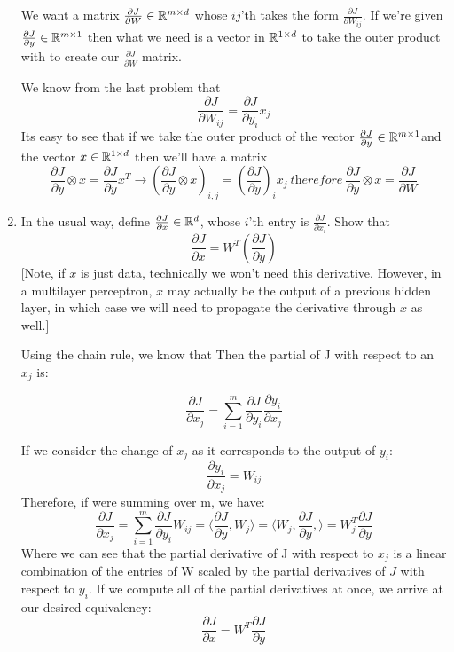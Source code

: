 \documentclass{article}
\theoremstyle{plain}
\theoremstyle{definition}
\begin{document}
\begin{enumerate}
\subitem

We want a matrix $\frac{\partial J}{\partial W}\in\mathbb{R}^{m\times d}$ whose $ij$'th takes the form $\frac{\partial J}{\partial W_{ij}}$. If we're given $\frac{\partial J}{\partial y}\in\mathbb{R}^{m\times1}$ then what we need is a vector in $\mathbb{R}^{1 \times d}$ to take the outer product with to create our $\frac{\partial J}{\partial W}$ matrix.

We know from the last problem that 
$$
\frac{\partial J}{\partial W_{ij}}=\frac{\partial J}{\partial y_{i}}x_{j}
$$
Its easy to see that if we take the outer product of the vector $\frac{\partial J}{\partial y} \in \mathbb{R}^{m \times 1}$and the vector $x \in \mathbb{R}^{1\times d}$ then we'll have a matrix 
$$
 \frac{\partial J}{\partial y} \otimes x = \frac{\partial J}{\partial y}x^T \rightarrow \left(\frac{\partial J}{\partial y}\otimes x\right)_{i,j} = \left(\frac{\partial J}{\partial y}\right)_i x_j \ \textit{therefore} \  \frac{\partial J}{\partial y} \otimes x =  \frac{\partial J}{\partial W} 
$$

\item In the usual way, define $\frac{\partial J}{\partial x}\in\mathbb{R}^{d}$,
whose $i$'th entry is $\frac{\partial J}{\partial x_{i}}$. Show
that 
\[
\frac{\partial J}{\partial x}=W^{T}\left(\frac{\partial J}{\partial y}\right)
\]
{[}Note, if $x$ is just data, technically we won't need this derivative.
However, in a multilayer perceptron, $x$ may actually be the output
of a previous hidden layer, in which case we will need to propagate
the derivative through $x$ as well.{]} \\

\subitem

Using the chain rule, we know that Then the partial of J with respect to an $x_j$ is: 

$$\frac{\partial J}{\partial x_j} = \sum_{i=1}^m \frac{\partial J}{\partial y_i} \frac{\partial y_i}{\partial x_j}$$ 

If we consider the change of $x_j$ as it corresponds to the output of $y_i$:
$$
    \frac{\partial y_i}{\partial x_j} = W_{ij}
$$
Therefore, if were summing over m, we have:
$$
    \frac{\partial J}{\partial x_j} = \sum_{i=1}^m \frac{\partial J}{\partial y_i} W_{ij} = \langle \frac{\partial J}{\partial y}, W_j \rangle = \langle W_j, \frac{\partial J}{\partial y},\rangle = W_j^T \frac{\partial J}{\partial y}
$$
Where we can see that the partial derivative of J with respect to $x_j$ is a linear combination of the entries of W scaled by the partial derivatives of $J$ with respect to $y_i$. If we compute all of the partial derivatives at once, we arrive at our desired equivalency:
$$
    \frac{\partial J}{\partial x} = W^T \frac{\partial J}{\partial y}
$$




\end{enumerate}
\end{document}
